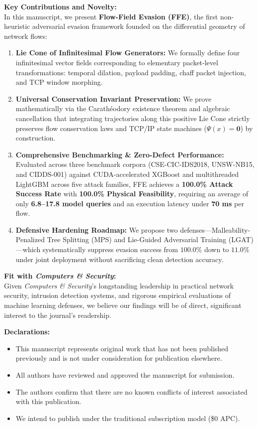 \documentclass[11pt]{article}
\begin{document}
\vspace{0.8em}
\noindent
\textbf{Key Contributions and Novelty:} \\
In this manuscript, we present \textbf{Flow-Field Evasion (FFE)}, the first non-heuristic adversarial evasion framework founded on the differential geometry of network flows:
\begin{enumerate}
    \item \textbf{Lie Cone of Infinitesimal Flow Generators:} We formally define four infinitesimal vector fields corresponding to elementary packet-level transformations: temporal dilation, payload padding, chaff packet injection, and TCP window morphing.
    \item \textbf{Universal Conservation Invariant Preservation:} We prove mathematically via the Carath{\'e}odory existence theorem and algebraic cancellation that integrating trajectories along this positive Lie Cone strictly preserves flow conservation laws and TCP/IP state machines ($\Psi(x) = \mathbf{0}$) by construction.
    \item \textbf{Comprehensive Benchmarking \& Zero-Defect Performance:} Evaluated across three benchmark corpora (CSE-CIC-IDS2018, UNSW-NB15, and CIDDS-001) against CUDA-accelerated XGBoost and multithreaded LightGBM across five attack families, FFE achieves a \textbf{100.0\% Attack Success Rate} with \textbf{100.0\% Physical Feasibility}, requiring an average of only \textbf{6.8--17.8 model queries} and an execution latency under \textbf{70 ms} per flow.
    \item \textbf{Defensive Hardening Roadmap:} We propose two defenses---Malleability-Penalized Tree Splitting (MPS) and Lie-Guided Adversarial Training (LGAT)---which systematically suppress evasion success from $100.0\%$ down to $11.0\%$ under joint deployment without sacrificing clean detection accuracy.
\end{enumerate}

\vspace{0.8em}
\noindent
\textbf{Fit with \textit{Computers \& Security}:} \\
Given \textit{Computers \& Security}'s longstanding leadership in practical network security, intrusion detection systems, and rigorous empirical evaluations of machine learning defenses, we believe our findings will be of direct, significant interest to the journal's readership. 

\vspace{0.8em}
\noindent
\textbf{Declarations:}
\begin{itemize}
    \item This manuscript represents original work that has not been published previously and is not under consideration for publication elsewhere.
    \item All authors have reviewed and approved the manuscript for submission.
    \item The authors confirm that there are no known conflicts of interest associated with this publication.
    \item We intend to publish under the traditional subscription model (\$0 APC).
\end{itemize}
\end{document}
